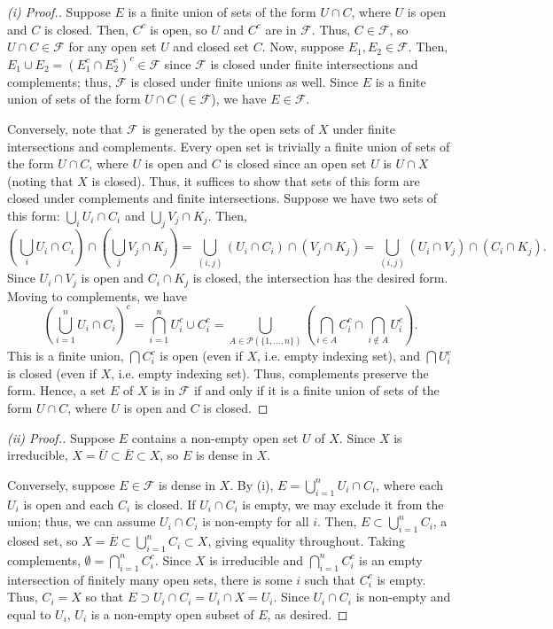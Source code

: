 \begin{proof}[(i) Proof.]
Suppose $E$ is a finite union of sets of the form $U \cap C$, where $U$ is open and $C$ is closed. Then, $C^c$ is open, so $U$ and $C^c$ are in $\mathcal{F}$. Thus, $C \in \mathcal{F}$,
so $U \cap C \in \mathcal{F}$ for any open set $U$ and closed set $C$. Now, suppose $E_1,E_2 \in \mathcal{F}$. Then, $E_1 \cup E_2 = (E_1^c \cap E_2^c)^c \in \mathcal{F}$ 
since $\mathcal{F}$ is closed under finite intersections and complements; thus, $\mathcal{F}$ is closed under finite unions as well. Since $E$ is a finite union of sets of the form 
$U \cap C$ ($\in \mathcal{F}$), we have $E \in \mathcal{F}$.

Conversely, note that $\mathcal{F}$ is generated by the open sets of $X$ under finite intersections and complements. Every open set is trivially a finite union of sets of the form $U \cap C$,
where $U$ is open and $C$ is closed since an open set $U$ is $U \cap X$ (noting that $X$ is closed). Thus, it suffices to show that sets of this form are closed under complements and finite 
intersections. Suppose we have two sets of this form: $\bigcup_i U_i \cap C_i$ and $\bigcup_j V_j \cap K_j$. Then,
$$\left(\bigcup_i U_i \cap C_i\right)\cap\left(\bigcup_j V_j \cap K_j\right) = \bigcup_{(i,j)} (U_i \cap C_i) \cap (V_j \cap K_j) = \bigcup_{(i,j)} (U_i \cap V_j) \cap (C_i \cap K_j).$$
Since $U_i \cap V_j$ is open and $C_i \cap K_j$ is closed, the intersection has the desired form. Moving to complements, we have
$$\left(\bigcup_{i=1}^n U_i \cap C_i\right)^c = \bigcap_{i=1}^n U_i^c \cup C_i^c = \bigcup_{A \in \mathcal{P}(\{1,\ldots,n\})} \left(\bigcap_{i \in A} C_i^c \cap \bigcap_{i \not\in A} U_i^c\right).$$
This is a finite union, $\bigcap C_i^c$ is open (even if $X$, i.e. empty indexing set), and $\bigcap U_i^c$ is closed (even if $X$, i.e. empty indexing set). Thus, complements preserve the form.
Hence, a set $E$ of $X$ is in $\mathcal{F}$ if and only if it is a finite union of sets of the form $U \cap C$, where $U$ is open and $C$ is closed.
\end{proof}

\begin{proof}[(ii) Proof.]
Suppose $E$ contains a non-empty open set $U$ of $X$. Since $X$ is irreducible, $X = \overline{U} \subset \overline{E} \subset X$, so $E$ is dense in $X$.

Conversely, suppose $E \in \mathcal{F}$ is dense in $X$. By (i), $E = \bigcup_{i=1}^n U_i \cap C_i$, where each $U_i$ is open and each $C_i$ is closed. If $U_i \cap C_i$
is empty, we may exclude it from the union; thus, we can assume $U_i \cap C_i$ is non-empty for all $i$. Then,
$E \subset \bigcup_{i=1}^n C_i$, a closed set, so $X = \overline{E} \subset \bigcup_{i=1}^n C_i \subset X$, giving equality throughout. Taking complements,
$\emptyset = \bigcap_{i=1}^n C_i^c$. Since $X$ is irreducible and $\bigcap_{i=1}^n C_i^c$ is an empty intersection of finitely many open sets, there is some $i$
such that $C_i^c$ is empty. Thus, $C_i = X$ so that $E \supset U_i \cap C_i = U_i \cap X = U_i$. Since $U_i \cap C_i$ is non-empty and equal to $U_i$, $U_i$ is 
a non-empty open subset of $E$, as desired.
\end{proof}

